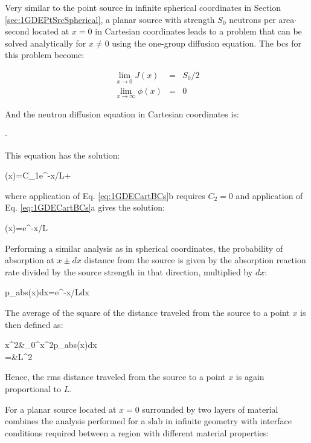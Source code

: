 Very similar to the point source in infinite spherical coordinates in Section \ref{sec:1GDEPtSrcSpherical}, a planar source with strength \(S_0\) neutrons per area\(\cdot\)second located at \(x=0\) in Cartesian coordinates leads to a problem that can be solved analytically for \(x\neq0\) using the one-group diffusion equation. The \glspl{bc} for this problem become:

\begin{subequations}
\label{eq:1GDECartBCs}
\begin{eqnarray}
\lim_{x\rightarrow0}J(x)&=&S_0/2\\
\lim_{x\rightarrow\infty}\phi(x)&=&0
\end{eqnarray}
\end{subequations}

And the neutron diffusion equation in Cartesian coordinates is:

\beq
{}-
\eeq

This equation has the solution:

\beq
\phi(x)=C_1e^{-x/L}+
\eeq

where application of Eq. \eqref{eq:1GDECartBCs}b requires \(C_2=0\) and application of Eq. \eqref{eq:1GDECartBCs}a gives the solution:

\beq
\phi(x)=e^{-x/L}
\eeq

Performing a similar analysis as in spherical coordinates, the probability of absorption at \(x\pm dx\) distance from the source is given by the absorption reaction rate divided by the source strength in that direction, multiplied by \(dx\):

\beq
p_{abs}(x)dx=e^{-x/L}dx
\eeq

The average of the square of the distance traveled from the source to a point \(x\) is then defined as:

\beqa
\langle x^2\rangle\equiv&\int_0^\infty x^2p_{abs}(x)dx\\
=&L^2
\eeqa

Hence, the \gls{rms} distance traveled from the source to a point \(x\) is again proportional to \(L\).


For a planar source located at \(x=0\) surrounded by two layers of material combines the analysis performed for a slab in infinite geometry with interface conditions required between a region with different material properties:

